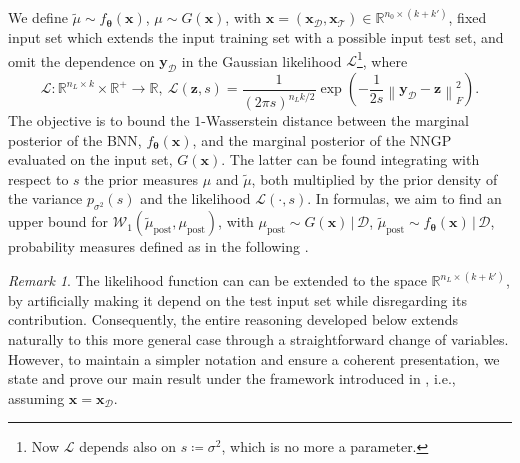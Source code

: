 \documentclass[a4paper, 11pt, reqno]{amsart}
\theoremstyle{plain}
\theoremstyle{remark}
\newtheorem{remark}[theorem]{Remark}
\theoremstyle{definition}
\newcommand{\given}{\, | \,}
\newcommand{\wass}[3][2]{\mathcal{W}_{#1}\left(#2, #3\right)}
\newcommand{\real}{\mathbb{R}}
\newcommand{\norm}[1]{\left\lVert#1\right\rVert}
\renewcommand{\exp}[1]{\operatorname{exp}\left(#1\right)}
\newcommand{\train}{\mathcal{D}}
\begin{document}
We define $\widetilde{\mu} \sim f_{\bm{\theta}}(\bm{x})$, $\mu \sim G(\bm{x})$, with $\bm{x} = (\bm{x}_{\mathcal{D}}, \bm{x}_{\mathcal{T}}) \in \real^{n_0 \times (k + k')}$, fixed input set which extends the input training set with a possible input test set, and omit the dependence on $\bm{y}_{\mathcal{D}}$ in the Gaussian likelihood $\mathcal{L}$\footnote{Now $\mathcal{L}$ depends also on $s \coloneqq \sigma^2$, which is no more a parameter.}, where
\begin{equation} \label{eq:likelihood}
    \mathcal{L}: \real^{n_L \times k} \times \real^{+} \to \real, \ \mathcal{L}(\bm{z}, s) = \frac{1}{\left(2 \pi s\right)^{n_L k / 2}} \exp{-\frac{1}{2 s} \norm{\bm{y}_{\mathcal{D}} - \bm{z}}_F^2}.
\end{equation}
The objective is to bound the $1$-Wasserstein distance between the marginal posterior of the BNN, $f_{\bm{\theta}}(\bm{x})$, and the marginal posterior of the NNGP evaluated on the input set, $G(\bm{x})$. The latter can be found integrating with respect to $s$ the prior measures $\mu$ and $\widetilde{\mu}$, both multiplied by the prior density of the variance $p_{\sigma^2}(s)$ and the likelihood $\mathcal{L}(\cdot, s)$.
In formulas, we aim to find an upper bound for $\wass[1]{\widetilde{\mu}_{\mathrm{post}}}{\mu_{\mathrm{post}}}$, with $\mu_{\mathrm{post}} \sim G(\bm{x}) \given \train$, $\widetilde{\mu}_{\mathrm{post}} \sim f_{\bm{\theta}}(\bm{x}) \given \train$, probability measures defined as in the following .

\begin{remark}
    The likelihood function can can be extended to the space $\real^{n_L \times (k + k')}$, by artificially making it depend on the test input set while disregarding its contribution. 
    Consequently, the entire reasoning developed below extends naturally to this more general case through a straightforward change of variables. 
    However, to maintain a simpler notation and ensure a coherent presentation, we state and prove our main result under the framework introduced in , i.e., assuming $\bm{x} = \bm{x}_{\mathcal{D}}$.
\end{remark}
\end{document}
